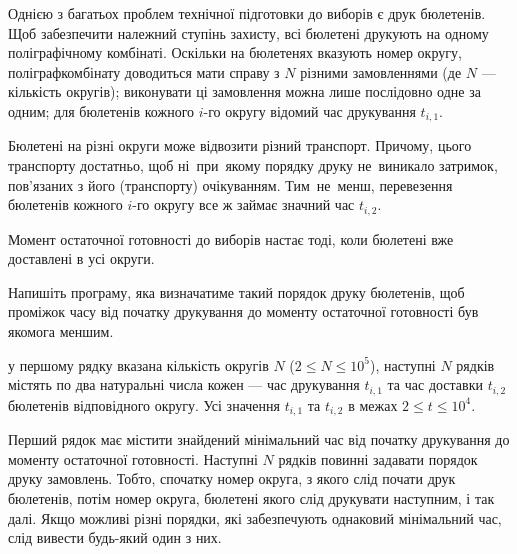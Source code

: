 ﻿Однією з багатьох проблем технічної підготовки до виборів є друк бюлетенів. Щоб
забезпечити належний ступінь захисту, всі бюлетені друкують на одному поліграфічному
комбінаті. Оскільки на бюлетенях вказують номер округу, поліграфкомбінату доводиться
мати справу з $N$ різними замовленнями (де $N$ --- кількість округів); виконувати ці замовлення
можна лише послідовно одне за одним; для бюлетенів кожного $i$-го округу відомий час
друкування $t_{i,1}$.

Бюлетені на різні округи може відвозити різний транспорт. Причому, цього транспорту
достатньо, щоб ні~при~якому порядку друку не~виникало затримок, пов’язаних з його
(транспорту) очікуванням. Тим~не~менш, перевезення бюлетенів кожного $i$-го округу все ж
займає значний час $t_{i,2}$.

Момент остаточної готовності до виборів настає тоді, коли бюлетені вже доставлені в усі
округи.

Напишіть програму, яка визначатиме такий порядок друку бюлетенів, щоб проміжок часу від
початку друкування до моменту остаточної готовності був якомога меншим.

\InputFile
у першому рядку вказана кількість округів $N$ ($2\leqslant N \leqslant 10^5$), наступні $N$ рядків
містять по два натуральні числа кожен --- час друкування $t_{i,1}$ та час доставки $t_{i,2}$ бюлетенів
відповідного округу. Усі значення $t_{i,1}$ та $t_{i,2}$ в межах $2\leqslant t\leqslant 10^4$.

\OutputFile
Перший рядок має містити знайдений мінімальний час від початку друкування
до моменту остаточної готовності. Наступні $N$ рядків повинні задавати порядок друку
замовлень. Тобто, спочатку номер округа, з якого слід почати друк бюлетенів, потім номер
округа, бюлетені якого слід друкувати наступним, і так далі. Якщо можливі різні порядки,
які забезпечують однаковий мінімальний час, слід вивести будь-який один з них.

\Examples
\begin{example}
\end{example}

